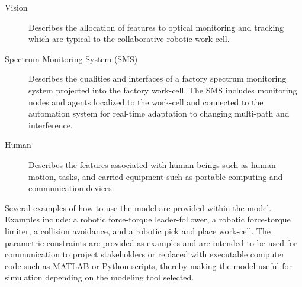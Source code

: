 \begin{description}
\item[Vision] Describes the allocation of features to optical monitoring and tracking which are typical to the collaborative robotic work-cell.

\item[Spectrum Monitoring System (SMS)] Describes the qualities and interfaces of a factory spectrum monitoring system projected into the factory work-cell.  The SMS includes monitoring nodes and agents localized to the work-cell and connected to the automation system for real-time adaptation to changing multi-path and interference. 

\item[Human] Describes the features associated with human beings such as human motion, tasks, and carried equipment such as portable computing and communication devices.
\vspace{3mm} 

\end{description}

Several examples of how to use the model are provided within the model\cite{Candell2018SysML.GitHub}.  Examples include: a robotic force-torque leader-follower, a robotic force-torque limiter, a collision avoidance, and a robotic pick and place work-cell.  The parametric constraints are provided as examples and are intended to be used for communication to project stakeholders or replaced with executable computer code such as MATLAB or Python scripts, thereby making the model useful for simulation depending on the modeling tool selected.

